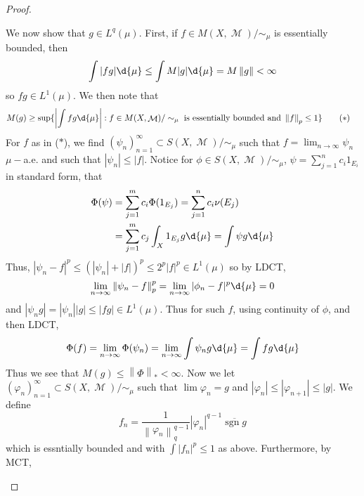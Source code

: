 \documentclass[11pt, a4paper]{memoir}
\newcommand{\norm}[1]{\ensuremath{\left\lVert#1\right\rVert}}
\theoremstyle{change}
\theoremstyle{plain}
\theoremstyle{nonumberplain}
\newtheorem{proof}{Proof}
\DeclareMathOperator{\M}{{\mathcal{M}}}
\DeclareMathOperator{\sgn}{sgn}
\begin{document}
\begin{proof}
\begin{enumerate}[label=(\roman*)]
            We now show that $g\in L^q(\mu)$.
            First, if $f\in M(X,\M)/\sim_\mu$ is essentially bounded, then
            \begin{equation*}
                \int|fg|\d{\mu}\leq\int M|g|\d{\mu}=M\norm{g}<\infty
            \end{equation*}
            so $fg\in L^1(\mu)$.
            We then note that
            \begin{align*}
                M(g) &\geq \sup\{\left\lvert\int fg\d{\mu}\right\rvert:f\in M(X,\M)/\sim_\mu\text{ is essentially bounded and }\norm{f}_p\leq 1\}\tag{$*$}
            \end{align*}
            For $f$ as in ($*$), we find $(\psi_n)_{n=1}^\infty\subset S(X,\M)/\sim_\mu$ such that $f=\lim_{n\to\infty}\psi_n$ $\mu-$a.e. and such that $|\psi_n|\leq|f|$.
            Notice for $\phi\in S(X,\M)/\sim_\mu$, $\psi=\sum_{j=1}^n c_i1_{E_i}$ in standard form, that
            \begin{align*}
                \Phi(\psi)&= \sum_{j=1}^m c_i\Phi(1_{E_j})=\sum_{j=1}^n c_i\nu(E_j)\\
                          &=\sum_{j=1}^m c_j\int_X 1_{E_j}g\d{\mu}=\int\psi g\d{\mu}
            \end{align*}
            Thus, $|\psi_n-f|^p\leq(|\psi_n|+|f|)^p\leq 2^p|f|^p\in L^1(\mu)$ so by LDCT,
            \begin{equation*}
                \lim_{n\to\infty}\norm{\psi_n-f}_p^p=\lim_{n\to\infty}|\phi_n-f|^p\d{\mu}=0
            \end{equation*}
            and $|\psi_ng|=|\psi_n||g|\leq|fg|\in L^1(\mu)$.
            Thus for such $f$, using continuity of $\phi$, and then LDCT,
            \begin{align*}
                \Phi(f)=\lim_{n\to\infty}\Phi(\psi_n)=\lim_{n\to\infty}\int\psi_n g\d{\mu}=\int fg\d{\mu}
            \end{align*}
            Thus we see that $M(g)\leq\norm{\Phi}_*<\infty$.
            Now we let $(\varphi_n)_{n=1}^\infty\subset S(X,\M)/\sim_\mu$ such that $\lim\varphi_n=g$ and $|\varphi_n|\leq|\varphi_{n+1}|\leq|g|$.
            We define
            \begin{equation*}
                f_n=\frac{1}{\norm{\varphi_n}_q^{q-1}}|\varphi_n|^{q-1}\overline{\sgn g}
            \end{equation*}
            which is essntially bounded and with $\int|f_n|^p\leq 1$ as above.
            Furthermore, by MCT,
            \begin{equation*}

\end{equation*}
\end{enumerate}
\end{proof}
\end{document}
